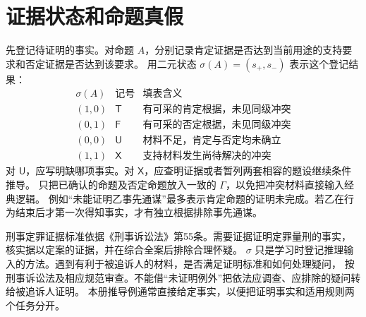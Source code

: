 \begin{center}
\end{center}

\section{证据状态和命题真假}

先登记待证明的事实。对命题 $A$，分别记录肯定证据是否达到当前用途的支持要求和否定证据是否达到该要求。
用二元状态 $\sigma(A)=(s_+,s_-)$ 表示这个登记结果：
\[
\begin{array}{c|c|l}
 \sigma(A)&\text{记号}&\text{填表含义}\\\hline
 (1,0)&\mathsf T&\text{有可采的肯定根据，未见同级冲突}\\
 (0,1)&\mathsf F&\text{有可采的否定根据，未见同级冲突}\\
 (0,0)&\mathsf U&\text{材料不足，肯定与否定均未确立}\\
 (1,1)&\mathsf X&\text{支持材料发生尚待解决的冲突}
\end{array}
\]
对 $\mathsf U$，应写明缺哪项事实。对 $\mathsf X$，应查明证据或者暂列两套相容的题设继续条件推导。
只把已确认的命题及否定命题放入一致的 $\Gamma$，以免把冲突材料直接输入经典逻辑。
例如“未能证明乙事先通谋”最多表示肯定命题的证明未完成。若乙在行为结束后才第一次得知事实，才有独立根据排除事先通谋。

刑事定罪证据标准依据《刑事诉讼法》第55条。需要证据证明定罪量刑的事实，
核实据以定案的证据，并在综合全案后排除合理怀疑。
$\sigma$ 只是学习时登记推理输入的方法。遇到有利于被追诉人的材料，是否满足证明标准和如何处理疑问，
按刑事诉讼法及相应规范审查。不能借“未证明例外”把依法应调查、应排除的疑问转给被追诉人证明。
本册推导例通常直接给定事实，以便把证明事实和适用规则两个任务分开。


